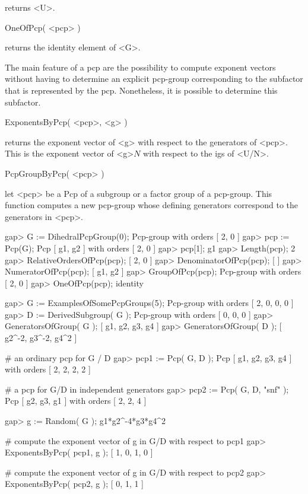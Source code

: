 returns <U>.


\>OneOfPcp( <pcp> )

returns the identity element of <G>.

\bigskip
The main feature of a pcp are the  possibility to compute exponent
vectors without having to determine an explicit pcp-group corresponding
to the subfactor that is represented by the pcp. Nonetheless, it is
possible to determine this subfactor.

\>ExponentsByPcp( <pcp>, <g> )

returns the exponent vector  of <g> with  respect to the generators of
<pcp>.  This is the exponent vector of <g>$N$ with  respect to the igs
of <U/N>.

\>PcpGroupByPcp( <pcp> )

let <pcp> be a Pcp of a subgroup or a factor group of a pcp-group. This
function computes a new pcp-group whose defining generators correspond
to the generators in <pcp>.


\beginexample
gap>  G := DihedralPcpGroup(0);
Pcp-group with orders [ 2, 0 ]
gap>  pcp := Pcp(G);
Pcp [ g1, g2 ] with orders [ 2, 0 ]
gap>  pcp[1];
g1
gap>  Length(pcp);
2
gap>  RelativeOrdersOfPcp(pcp);
[ 2, 0 ]
gap>  DenominatorOfPcp(pcp);
[  ]
gap>  NumeratorOfPcp(pcp);
[ g1, g2 ]
gap>  GroupOfPcp(pcp);
Pcp-group with orders [ 2, 0 ]
gap> OneOfPcp(pcp);
identity
\endexample

\beginexample
gap> G := ExamplesOfSomePcpGroups(5);
Pcp-group with orders [ 2, 0, 0, 0 ]
gap> D := DerivedSubgroup( G );
Pcp-group with orders [ 0, 0, 0 ]
gap>  GeneratorsOfGroup( G );
[ g1, g2, g3, g4 ]
gap>  GeneratorsOfGroup( D );
[ g2^-2, g3^-2, g4^2 ]

# an ordinary pcp for G / D
gap> pcp1 := Pcp( G, D );
Pcp [ g1, g2, g3, g4 ] with orders [ 2, 2, 2, 2 ]

# a pcp for G/D in independent generators
gap>  pcp2 := Pcp( G, D, "snf" );
Pcp [ g2, g3, g1 ] with orders [ 2, 2, 4 ]

gap>  g := Random( G );
g1*g2^-4*g3*g4^2

# compute the exponent vector of g in G/D with respect to pcp1
gap> ExponentsByPcp( pcp1, g );
[ 1, 0, 1, 0 ]

# compute the exponent vector of g in G/D with respect to pcp2
gap>  ExponentsByPcp( pcp2, g );
[ 0, 1, 1 ]
\endexample


